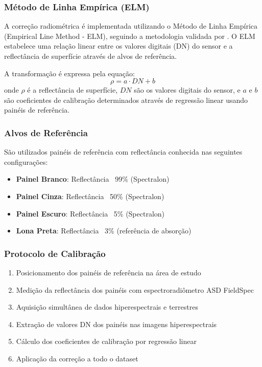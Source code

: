 \subsubsection{Método de Linha Empírica (ELM)}
A correção radiométrica é implementada utilizando o Método de Linha Empírica (Empirical Line Method - ELM), seguindo a metodologia validada por \cite{Shin2024}. O ELM estabelece uma relação linear entre os valores digitais (DN) do sensor e a reflectância de superfície através de alvos de referência.

A transformação é expressa pela equação:
\begin{equation}
\rho = a \cdot DN + b
\end{equation}
onde $\rho$ é a reflectância de superfície, $DN$ são os valores digitais do sensor, e $a$ e $b$ são coeficientes de calibração determinados através de regressão linear usando painéis de referência.

\subsubsection{Alvos de Referência}
São utilizados painéis de referência com reflectância conhecida nas seguintes configurações:
\begin{itemize}
    \item \textbf{Painel Branco}: Reflectância ~99\% (Spectralon)
    \item \textbf{Painel Cinza}: Reflectância ~50\% (Spectralon)
    \item \textbf{Painel Escuro}: Reflectância ~5\% (Spectralon)
    \item \textbf{Lona Preta}: Reflectância ~3\% (referência de absorção)
\end{itemize}

\subsubsection{Protocolo de Calibração}
\begin{enumerate}
    \item Posicionamento dos painéis de referência na área de estudo
    \item Medição da reflectância dos painéis com espectroradiômetro ASD FieldSpec
    \item Aquisição simultânea de dados hiperespectrais e terrestres
    \item Extração de valores DN dos painéis nas imagens hiperespectrais
    \item Cálculo dos coeficientes de calibração por regressão linear
    \item Aplicação da correção a todo o dataset
\end{enumerate}

